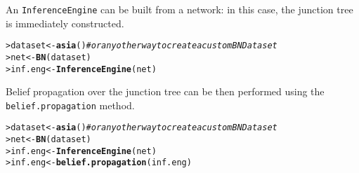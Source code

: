 \documentclass{article}\usepackage[]{graphicx}\usepackage[]{color}
\makeatletter
\newcommand{\hlcom}[1]{\textcolor[rgb]{0.678,0.584,0.686}{\textit{#1}}}%
\newcommand{\hlstd}[1]{\textcolor[rgb]{0.345,0.345,0.345}{#1}}%
\newcommand{\hlkwb}[1]{\textcolor[rgb]{0.69,0.353,0.396}{#1}}%
\newcommand{\hlkwd}[1]{\textcolor[rgb]{0.737,0.353,0.396}{\textbf{#1}}}%
\newenvironment{kframe}{%
 \def\at@end@of@kframe{}%
 \ifinner\ifhmode%
  \def\at@end@of@kframe{\end{minipage}}%
  \begin{minipage}{\columnwidth}%
 \fi\fi%
 \def\FrameCommand##1{\hskip\@totalleftmargin \hskip-\fboxsep
 \colorbox{shadecolor}{##1}\hskip-\fboxsep
     \hskip-\linewidth \hskip-\@totalleftmargin \hskip\columnwidth}%
 \MakeFramed {\advance\hsize-\width
   \@totalleftmargin\z@ \linewidth\hsize
   \@setminipage}}%
 {\par\unskip\endMakeFramed%
 \at@end@of@kframe}
\newenvironment{knitrout}{}{} %
\newcommand{\Robject}[1]{{\texttt{#1}}}
\newcommand{\Rmethod}[1]{{\texttt{#1}}}
\makeatother
\begin{document}
An \Robject{InferenceEngine} can be built from a network: in this case, the junction tree is immediately constructed.
\begin{knitrout}
\color{fgcolor}\begin{kframe}
\begin{alltt}
\hlstd{> }\hlstd{dataset} \hlkwb{<-} \hlkwd{asia}\hlstd{()} \hlcom{# or any other way to create a custom BNDataset}
\hlstd{> }\hlstd{net}     \hlkwb{<-} \hlkwd{BN}\hlstd{(dataset)}
\hlstd{> }\hlstd{inf.eng} \hlkwb{<-} \hlkwd{InferenceEngine}\hlstd{(net)}
\end{alltt}
\end{kframe}
\end{knitrout}

Belief propagation over the junction tree can be then performed using the \Rmethod{belief.propagation} method.
\begin{knitrout}
\color{fgcolor}\begin{kframe}
\begin{alltt}
\hlstd{> }\hlstd{dataset} \hlkwb{<-} \hlkwd{asia}\hlstd{()} \hlcom{# or any other way to create a custom BNDataset}
\hlstd{> }\hlstd{net}     \hlkwb{<-} \hlkwd{BN}\hlstd{(dataset)}
\hlstd{> }\hlstd{inf.eng} \hlkwb{<-} \hlkwd{InferenceEngine}\hlstd{(net)}
\hlstd{> }\hlstd{inf.eng} \hlkwb{<-} \hlkwd{belief.propagation}\hlstd{(inf.eng)}
\end{alltt}
\end{kframe}
\end{knitrout}
\end{document}
